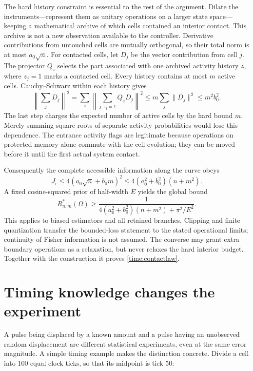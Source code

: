 \documentclass[11pt,a4paper]{article}
\numberwithin{equation}{section}
\theoremstyle{remark}
\begin{document}
The hard history constraint is essential to the rest of the argument.
Dilate the instruments---represent them as unitary operations on a larger
state space---keeping a mathematical archive of which cells
contained an interior contact. This archive is not a new observation
available to the controller. Derivative contributions from untouched cells
are mutually orthogonal, so their total norm is at most $a_0\sqrt n$.
For contacted cells, let $D_j$ be the vector contribution from cell $j$.
The projector $Q_z$ selects the part associated with one archived activity
history $z$, where $z_j=1$ marks a contacted cell. Every history
contains at most $m$ active cells. Cauchy--Schwarz within each history gives
\begin{equation}
 \left\|\sum_jD_j\right\|^2
 =\sum_z\left\|\sum_{j:z_j=1}Q_zD_j\right\|^2
 \le m\sum_j\|D_j\|^2\le m^2b_0^2.
\end{equation}
The last step charges the expected number of active cells by the hard bound
$m$. Merely summing square roots of separate activity probabilities would
lose this dependence. The entrance activity flags are legitimate because
operations on protected memory alone commute with the cell evolution;
they can be moved before it until the first actual system contact.

Consequently the complete accessible information along the curve obeys
\begin{equation}
 J_\epsilon\le4(a_0\sqrt n+b_0m)^2
 \le4(a_0^2+b_0^2)(n+m^2).
\end{equation}
A fixed cosine-squared prior of half-width $E$ yields the global bound
\begin{equation}
 R_{n,m}^{*}(\Omega)\ge
 \frac{1}{4(a_0^2+b_0^2)(n+m^2)+\pi^2/E^2}.
\end{equation}
This applies to biased estimators and all retained branches. Clipping and
finite quantization transfer the bounded-loss statement to the stated
operational limits; continuity of Fisher information is not assumed.
The converse may grant extra boundary operations as a relaxation, but never
relaxes the hard interior budget. Together with the construction it proves
\eqref{time:contactlaw}.

\section{Timing knowledge changes the experiment}
\label{time:timing}

A pulse being displaced by a known amount and a pulse having an unobserved
random displacement are different statistical experiments, even at the same
error magnitude. A simple timing example makes the distinction concrete.
Divide a cell into 100 equal clock ticks, so that its midpoint is tick 50:
\end{document}
